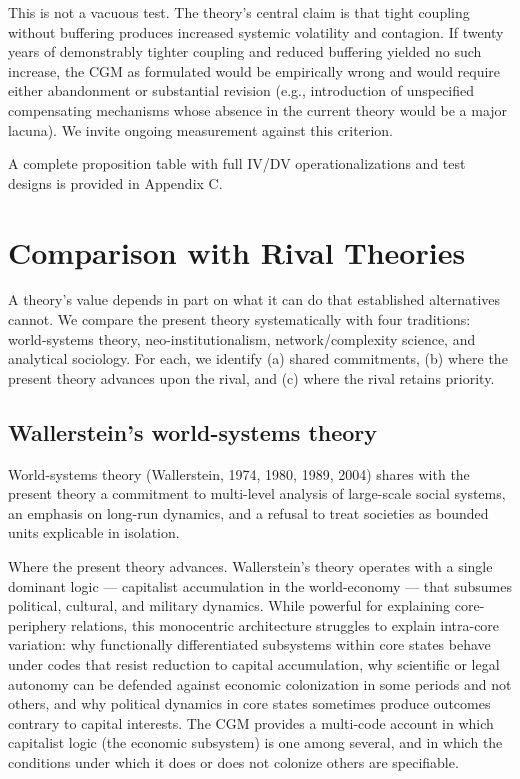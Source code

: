 \documentclass[12pt,a4paper]{article}
\begin{document}
This is not a vacuous test. The theory's central claim is that tight coupling without buffering produces increased systemic volatility and contagion. If twenty years of demonstrably tighter coupling and reduced buffering yielded no such increase, the CGM as formulated would be empirically wrong and would require either abandonment or substantial revision (e.g., introduction of unspecified compensating mechanisms whose absence in the current theory would be a major lacuna). We invite ongoing measurement against this criterion.


A complete proposition table with full IV/DV operationalizations and test designs is provided in Appendix C.



\section{Comparison with Rival Theories}

A theory's value depends in part on what it can do that established alternatives cannot. We compare the present theory systematically with four traditions: world-systems theory, neo-institutionalism, network/complexity science, and analytical sociology. For each, we identify (a) shared commitments, (b) where the present theory advances upon the rival, and (c) where the rival retains priority.

\subsection{Wallerstein's world-systems theory}

World-systems theory (Wallerstein, 1974, 1980, 1989, 2004) shares with the present theory a commitment to multi-level analysis of large-scale social systems, an emphasis on long-run dynamics, and a refusal to treat societies as bounded units explicable in isolation.


Where the present theory advances. Wallerstein's theory operates with a single dominant logic --- capitalist accumulation in the world-economy --- that subsumes political, cultural, and military dynamics. While powerful for explaining core-periphery relations, this monocentric architecture struggles to explain intra-core variation: why functionally differentiated subsystems within core states behave under codes that resist reduction to capital accumulation, why scientific or legal autonomy can be defended against economic colonization in some periods and not others, and why political dynamics in core states sometimes produce outcomes contrary to capital interests. The CGM provides a multi-code account in which capitalist logic (the economic subsystem) is one among several, and in which the conditions under which it does or does not colonize others are specifiable.
\end{document}
